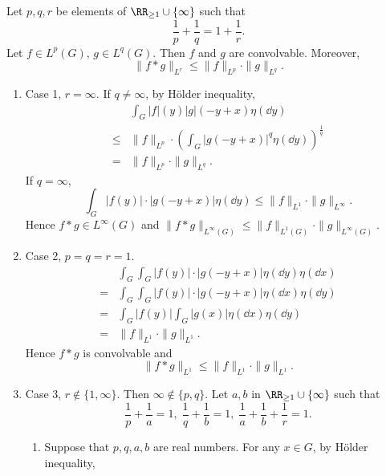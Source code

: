 \begin{theoremenv}
    Let $p,q,r$ be elements of $\RR_{\ge 1} \cup \{\infty\}$ such that
    $$\frac{1}{p} + \frac{1}{q} = 1 + \frac{1}{r}.$$
    Let $f \in L^p(G)$, $g \in L^q(G)$.
    Then $f$ and $g$ are convolvable.
    Moreover,
    $$\|f * g\|_{L^r} \le \|f\|_{L^p} \cdot \|g\|_{L^q}.$$
\end{theoremenv}
\begin{proofenv}
    \quad
    \begin{enumerate}
        \item Case 1, $r = \infty$. If $q \neq \infty$, by Hölder inequality,
            $$\begin{aligned}
                & \int_{G} |f|(y) |g|(-y+x) \eta(\dd y)\\
                \le & \|f\|_{L^p} \cdot \left(\int_{G} |g(-y+x)|^q \eta(\dd y)\right)^{\frac{1}{q}}\\
                = & \|f\|_{L^p} \cdot \|g\|_{L^q}.
            \end{aligned}$$
            If $q = \infty$,
            $$\int_{G} |f(y)|\cdot|g(-y+x)| \eta(\dd y) \le \|f\|_{L^1} \cdot \|g\|_{L^\infty}.$$
            Hence $f*g \in L^\infty(G)$ and $\|f*g\|_{L^\infty(G)} \le \|f\|_{L^1(G)} \cdot \|g\|_{L^\infty(G)}.$
        \item Case 2, $p=q=r=1$.
            $$\begin{aligned}
                & \int_{G} \int_{G} |f(y)|\cdot|g(-y+x)| \eta(\dd y) \eta(\dd x)\\
                = & \int_{G} \int_{G} |f(y)|\cdot|g(-y+x)| \eta(\dd x) \eta(\dd y)\\
                = & \int_{G} |f(y)| \int_{G} |g(x)| \eta(\dd x) \eta(\dd y)\\
                = & \|f\|_{L^1} \cdot \|g\|_{L^1}.
            \end{aligned}$$
            Hence $f*g$ is convolvable and
            $$\|f * g\|_{L^1} \le \|f\|_{L^1} \cdot \|g\|_{L^1}.$$
        \item Case 3, $r \notin \{1, \infty\}$.
            Then $\infty \notin \{p,q\}$.
            Let $a,b$ in $\RR_{\ge 1} \cup \{\infty\}$ such that
            $$\frac{1}{p} + \frac{1}{a} = 1,\; \frac{1}{q} + \frac{1}{b} = 1, \; \frac{1}{a} + \frac{1}{b} + \frac{1}{r} = 1.$$
            \begin{enumerate}
                \item Suppose that $p,q,a,b$ are real numbers.
                    For any $x \in G$, by Hölder inequality,

\end{enumerate}
\end{enumerate}
\end{proofenv}
